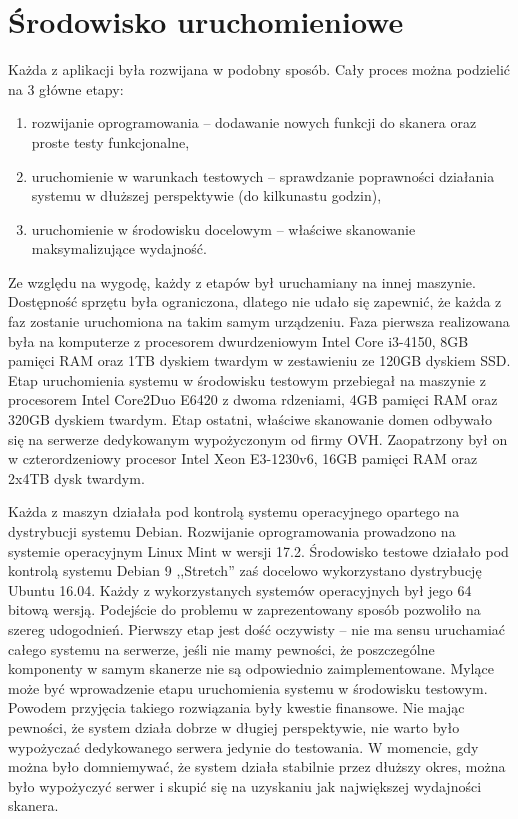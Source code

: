 \section{Środowisko uruchomieniowe}
Każda z aplikacji była rozwijana w podobny sposób. Cały proces można podzielić na 3 główne etapy:
\begin{enumerate}
	\item rozwijanie oprogramowania -- dodawanie nowych funkcji do skanera oraz proste testy funkcjonalne,
	\item uruchomienie w warunkach testowych -- sprawdzanie poprawności działania systemu w dłuższej perspektywie (do kilkunastu godzin),
	\item uruchomienie w środowisku docelowym -- właściwe skanowanie maksymalizujące wydajność.
\end{enumerate}
Ze względu na wygodę, każdy z etapów był uruchamiany na innej maszynie. Dostępność sprzętu była ograniczona, dlatego nie udało się
zapewnić, że każda z faz zostanie uruchomiona na takim samym urządzeniu. Faza pierwsza realizowana była na komputerze z procesorem
dwurdzeniowym Intel Core i3-4150, 8GB pamięci RAM oraz 1TB dyskiem twardym w zestawieniu ze 120GB dyskiem SSD. Etap uruchomienia systemu w
środowisku testowym przebiegał na maszynie z procesorem Intel Core2Duo E6420 z dwoma rdzeniami, 4GB pamięci RAM oraz 320GB dyskiem twardym. Etap ostatni,
właściwe skanowanie domen odbywało się na serwerze dedykowanym wypożyczonym od firmy OVH. Zaopatrzony był on w czterordzeniowy
procesor Intel Xeon E3-1230v6, 16GB pamięci RAM oraz 2x4TB dysk twardym.

Każda z maszyn działała pod kontrolą systemu operacyjnego opartego na dystrybucji systemu Debian. Rozwijanie oprogramowania prowadzono
na systemie operacyjnym Linux Mint w wersji 17.2. Środowisko testowe działało pod kontrolą systemu Debian 9 ,,Stretch'' zaś docelowo
wykorzystano dystrybucję Ubuntu 16.04. Każdy z wykorzystanych systemów operacyjnych był jego 64 bitową wersją. Podejście do problemu
w zaprezentowany sposób pozwoliło na szereg udogodnień. Pierwszy etap jest dość oczywisty -- nie ma sensu uruchamiać całego systemu
na serwerze, jeśli nie mamy pewności, że poszczególne komponenty w samym skanerze nie są odpowiednio zaimplementowane. Mylące może
być wprowadzenie etapu uruchomienia systemu w środowisku testowym. Powodem przyjęcia takiego rozwiązania były kwestie finansowe.
Nie mając pewności, że system działa dobrze w długiej perspektywie, nie warto było wypożyczać dedykowanego serwera jedynie do testowania.
W momencie, gdy można było domniemywać, że system działa stabilnie przez dłuższy okres, można było wypożyczyć serwer i skupić się
na uzyskaniu jak największej wydajności skanera.

